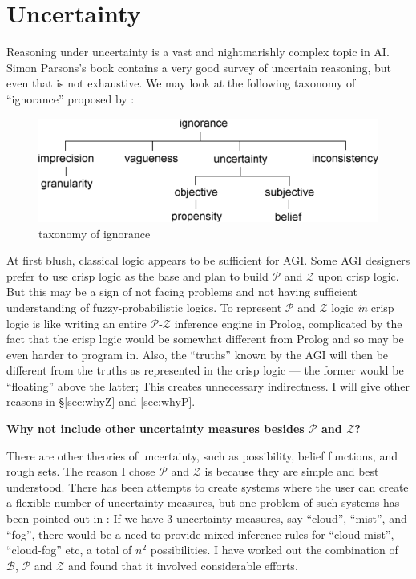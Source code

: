 \section{Uncertainty}

Reasoning under uncertainty is a vast and nightmarishly complex topic in AI.  Simon Parsons's book \citep*{Parsons2001} contains a very good survey of uncertain reasoning, but even that is not exhaustive.  We may look at the following taxonomy of ``ignorance'' proposed by \citep*{Bosc1997}:
\begin{figure}[H]
\centering
\includegraphics[scale=0.7]{IgnoranceTaxonomy.png}
\caption{taxonomy of ignorance}
\end{figure}

At first blush, classical logic appears to be sufficient for AGI.  Some AGI designers prefer to use crisp logic as the base and plan to build $\mathcal{P}$ and $\mathcal{Z}$ upon crisp logic.  But this may be a sign of not facing problems and not having sufficient understanding of fuzzy-probabilistic logics.  To represent $\mathcal{P}$ and $\mathcal{Z}$ logic \textit{in} crisp logic is like writing an entire $\mathcal{P}$-$\mathcal{Z}$ inference engine in Prolog, complicated by the fact that the crisp logic would be somewhat different from Prolog and so may be even harder to program in.  Also, the ``truths'' known by the AGI will then be different from the truths as represented in the crisp logic --- the former would be ``floating'' above the latter;  This creates unnecessary indirectness.  I will give other reasons in \S\ref{sec:whyZ} and \ref{sec:whyP}.

\textbf{Why not include other uncertainty measures besides $\mathcal{P}$ and $\mathcal{Z}$?}

There are other theories of uncertainty, such as possibility, belief functions, and rough sets.  The reason I chose $\mathcal{P}$ and $\mathcal{Z}$ is because they are simple and best understood.  There has been attempts to create systems where the user can create a flexible number of uncertainty measures, but one problem of such systems has been pointed out in \citep*{Parsons2001}:  If we have 3 uncertainty measures, say ``cloud'', ``mist'', and ``fog'', there would be a need to provide mixed inference rules for ``cloud-mist'', ``cloud-fog'' etc, a total of $n^2$ possibilities.  I have worked out the combination of $\mathcal{B}$, $\mathcal{P}$ and $\mathcal{Z}$ and found that it involved considerable efforts.

